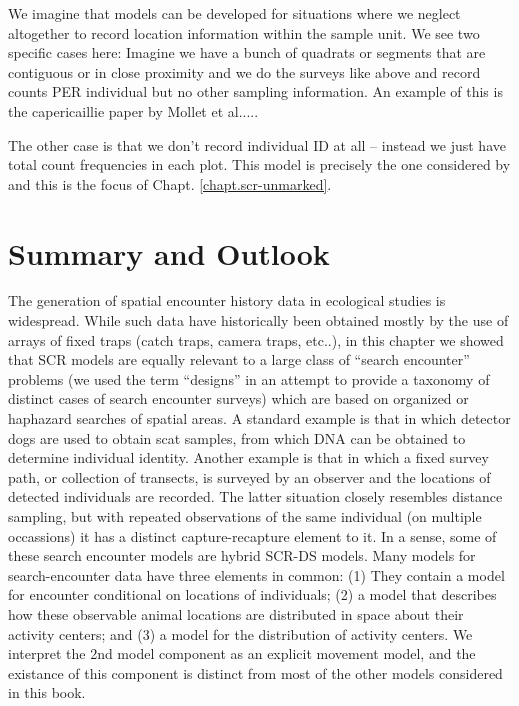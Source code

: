 We imagine that models can be developed for
situations where we neglect
altogether to record location information within the sample unit.
We see two specific cases here:
Imagine we have a bunch of quadrats or segments that are contiguous or
in close proximity
and we do the surveys like above and record counts PER individual  but
no other sampling information. An example of this is the capericaillie
paper by Mollet et al.....

The other case is that we don't record individual ID at all -- instead
we just have total count frequencies in each plot.
This model is precisely the one considered by
\citep{chandler_royle:2012} and this is the focus of Chapt. \ref{chapt.scr-unmarked}.





\section{Summary and Outlook}

The generation of spatial encounter history data in ecological studies
is widespread. While such data have historically been obtained  mostly by
the use of arrays of fixed traps (catch traps, camera traps, etc..),
in this chapter we showed that SCR models are equally relevant to a large
class of ``search encounter'' problems (we used the term ``designs''
in an attempt to provide a taxonomy of distinct cases of search encounter surveys) which are based on
organized or haphazard 
searches of spatial areas. A standard example
is that in which detector dogs are used to obtain scat samples, from which
DNA can be obtained to determine individual identity. 
Another example is that in which a
fixed survey path, or collection of transects, is surveyed by an
observer and the locations of detected individuals are recorded. The latter
situation closely resembles distance sampling, but with repeated
observations of the same individual (on multiple occassions) it has a
distinct capture-recapture element to it. In a sense, some of these
search encounter models are hybrid SCR-DS models.
Many models 
 for search-encounter data have three elements in common:
(1) They contain a model for encounter conditional on 
locations of individuals; (2)  a model that describes
how these observable animal locations are distributed in space about their
activity centers; and (3) a model for the distribution of activity centers.  We
interpret the 2nd model component 
as an explicit movement model, and the existance of this component 
is distinct from most of the
other models considered in this book. 

